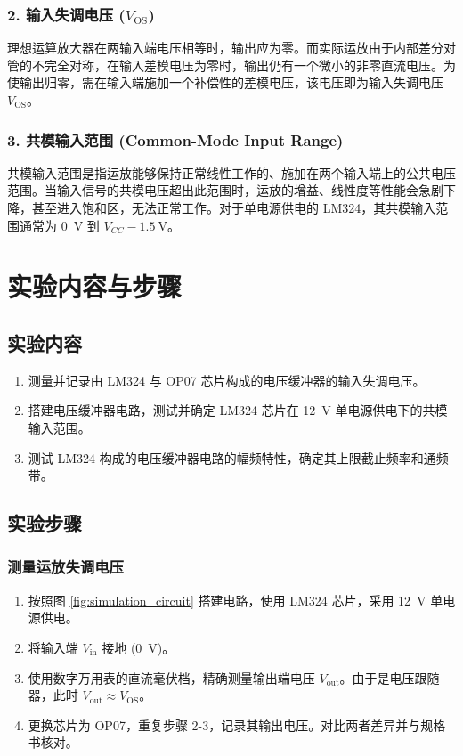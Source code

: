 \documentclass[UTF8, a4paper]{ctexrep} %
\begin{document}
\subsubsection{2. 输入失调电压 ($V_{\text{OS}}$)}
理想运算放大器在两输入端电压相等时，输出应为零。而实际运放由于内部差分对管的不完全对称，在输入差模电压为零时，输出仍有一个微小的非零直流电压。为使输出归零，需在输入端施加一个补偿性的差模电压，该电压即为输入失调电压 $V_{\text{OS}}$。

\subsubsection{3. 共模输入范围 (Common-Mode Input Range)}
共模输入范围是指运放能够保持正常线性工作的、施加在两个输入端上的公共电压范围。当输入信号的共模电压超出此范围时，运放的增益、线性度等性能会急剧下降，甚至进入饱和区，无法正常工作。对于单电源供电的 LM324，其共模输入范围通常为 \SI{0}{\volt} 到 $V_{CC} - \SI{1.5}{\volt}$。

\section{实验内容与步骤}\label{sec:opamp_content}
\subsection{实验内容}
\begin{enumerate}
    \item 测量并记录由 LM324 与 OP07 芯片构成的电压缓冲器的输入失调电压。
    \item 搭建电压缓冲器电路，测试并确定 LM324 芯片在 \SI{12}{\volt} 单电源供电下的共模输入范围。
    \item 测试 LM324 构成的电压缓冲器电路的幅频特性，确定其上限截止频率和通频带。
\end{enumerate}

\subsection{实验步骤}
\subsubsection{测量运放失调电压}
\begin{enumerate}
    \item 按照图 \ref{fig:simulation_circuit} 搭建电路，使用 LM324 芯片，采用 \SI{12}{\volt} 单电源供电。
    \item 将输入端 $V_{\text{in}}$ 接地 (\SI{0}{\volt})。
    \item 使用数字万用表的直流毫伏档，精确测量输出端电压 $V_{\text{out}}$。由于是电压跟随器，此时 $V_{\text{out}} \approx V_{\text{OS}}$。
    \item 更换芯片为 OP07，重复步骤 2-3，记录其输出电压。对比两者差异并与规格书核对。
\end{enumerate}
\end{document}
